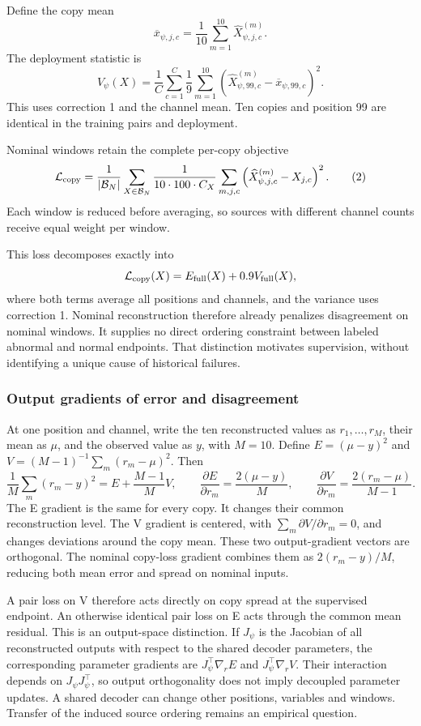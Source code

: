 \documentclass[
  english,
  10pt,
]{article}
\begin{document}
Define the copy mean \[
\overline x_{\psi,j,c}=\frac1{10}\sum_{m=1}^{10}\widehat X_{\psi,j,c}^{(m)}.
\] The deployment statistic is \[
V_\psi(X)=\frac1C\sum_{c=1}^{C}\frac1{9}
\sum_{m=1}^{10}
\left(\widehat X_{\psi,99,c}^{(m)}
-\overline x_{\psi,99,c}\right)^2.
\tag{1}
\] This uses correction 1 and the channel mean. Ten copies and position
99 are identical in the training pairs and deployment.

Nominal windows retain the complete per-copy objective \[
\mathcal L_{\rm copy}=
\frac1{|\mathcal B_N|}\sum_{X\in\mathcal B_N}
\frac1{10\cdot100\cdot C_X}
\sum_{m,j,c}
\left(\widehat X_{\psi,j,c}^{(m)}-X_{j,c}\right)^2.
\tag{2}
\] Each window is reduced before averaging, so sources with different
channel counts receive equal weight per window.

This loss decomposes exactly into \[
\mathcal L_{\rm copy}(X)=E_{\rm full}(X)+0.9V_{\rm full}(X),
\] where both terms average all positions and channels, and the variance
uses correction 1. Nominal reconstruction therefore already penalizes
disagreement on nominal windows. It supplies no direct ordering
constraint between labeled abnormal and normal endpoints. That
distinction motivates supervision, without identifying a unique cause of
historical failures.

\subsubsection{Output gradients of error and
disagreement}\label{output-gradients-of-error-and-disagreement}

At one position and channel, write the ten reconstructed values as
\(r_1,\ldots,r_M\), their mean as \(\mu\), and the observed value as
\(y\), with \(M=10\). Define \(E=(\mu-y)^2\) and
\(V=(M-1)^{-1}\sum_m(r_m-\mu)^2\). Then \[
\frac1M\sum_m(r_m-y)^2=E+\frac{M-1}{M}V,
\qquad
\frac{\partial E}{\partial r_m}=\frac{2(\mu-y)}{M},
\qquad
\frac{\partial V}{\partial r_m}=\frac{2(r_m-\mu)}{M-1}.
\tag{2a}
\] The E gradient is the same for every copy. It changes their common
reconstruction level. The V gradient is centered, with
\(\sum_m\partial V/\partial r_m=0\), and changes deviations around the
copy mean. These two output-gradient vectors are orthogonal. The nominal
copy-loss gradient combines them as \(2(r_m-y)/M\), reducing both mean
error and spread on nominal inputs.

A pair loss on V therefore acts directly on copy spread at the
supervised endpoint. An otherwise identical pair loss on E acts through
the common mean residual. This is an output-space distinction. If
\(J_\psi\) is the Jacobian of all reconstructed outputs with respect to
the shared decoder parameters, the corresponding parameter gradients are
\(J_\psi^\top\nabla_r E\) and \(J_\psi^\top\nabla_r V\). Their
interaction depends on \(J_\psi J_\psi^\top\), so output orthogonality
does not imply decoupled parameter updates. A shared decoder can change
other positions, variables and windows. Transfer of the induced source
ordering remains an empirical question.
\end{document}
